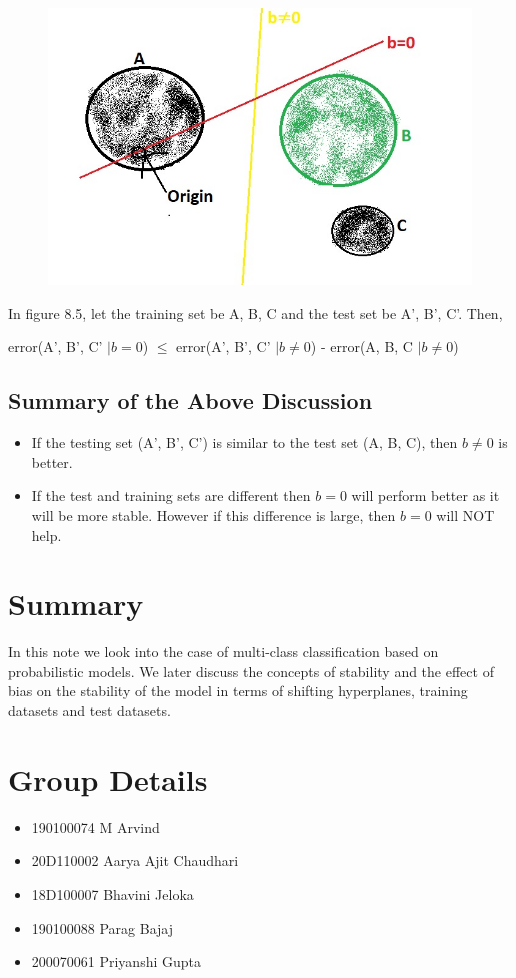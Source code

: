 \documentclass[11pt, twosides]{article}
\begin{document}
\begin{figure}[htbp]
\begin{center}
\includegraphics[scale=0.43]{419_5.jpeg}
\caption{}
\end{center}
\end{figure}
 
In figure 8.5, let the training set be A, B, C and the test set be A', B', C'. Then,\\ \begin{center}
    error(A', B', C' $ | b=0$) $\leq$ error(A', B', C' $| b\neq0$) - error(A, B, C $ | b\neq0$)
\end{center}
\subsection{Summary of the Above Discussion}
\begin{itemize}
    \item If the testing set (A', B', C') is similar to the test set (A, B, C), then $b\neq 0$ is better.
    \item If the test and training sets are different then $b=0$ will perform better as it will be more stable. However if this difference is large, then $b=0$ will NOT help.
\end{itemize}

\section{Summary}
In this note we look into the case of multi-class classification based on probabilistic models. We later discuss the concepts of stability and the effect of bias on the stability of the model in terms of shifting hyperplanes, training datasets and test datasets.

\section{Group Details}
\begin{itemize}
    \item 190100074	M Arvind
    \item 20D110002	Aarya Ajit Chaudhari
    \item 18D100007	Bhavini Jeloka
    \item 190100088	Parag Bajaj
    \item 200070061	Priyanshi Gupta
\end{itemize}
\end{document}
